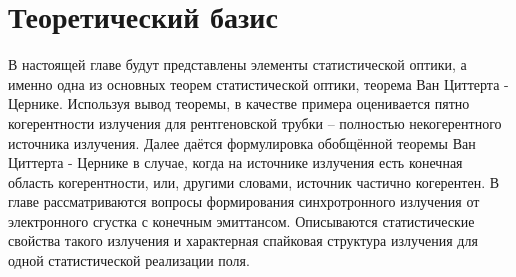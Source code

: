 \chapter{Теоретический базис} \label{chapt1}
В настоящей главе будут представлены элементы статистической оптики, а именно одна из основных теорем статистической оптики, теорема Ван Циттерта - Цернике. Используя вывод теоремы, в качестве примера оценивается пятно когерентности излучения для рентгеновской трубки -- полностью некогерентного источника излучения. Далее даётся формулировка обобщённой теоремы Ван Циттерта - Цернике в случае, когда на источнике излучения есть конечная область когерентности, или, другими словами, источник частично когерентен. В главе рассматриваются вопросы формирования синхротронного излучения от электронного сгустка с конечным эмиттансом. Описываются статистические свойства такого излучения и характерная спайковая структура излучения для одной статистической реализации поля.

